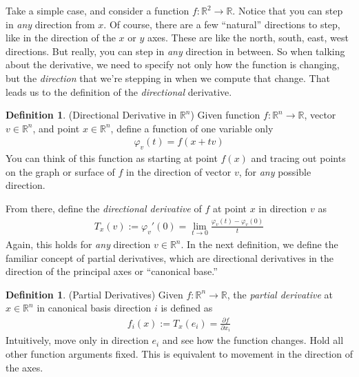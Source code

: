 \documentclass[12pt]{article}
\numberwithin{equation}{section} %
\theoremstyle{plain}
\theoremstyle{definition}
\newtheorem{defn}[thm]{Definition}
\theoremstyle{remark}
\newcommand{\R}{\mathbb{R}}
\newcommand{\Rn}{\mathbb{R}^n}
\begin{document}
Take a simple case, and consider a function $f:\R^2\rightarrow \R$.
Notice that you can step in \emph{any} direction from $x$. Of course,
there are a few ``natural'' directions to step, like in the direction of
the $x$ or $y$ axes. These are like the north, south, east, west
directions. But really, you can step in \emph{any} direction in between.
So when talking about the derivative, we need to specify not only how
the function is changing, but the \emph{direction} that we're stepping
in when we compute that change. That leads us to the definition of the
\emph{directional} derivative.
\begin{figure}[htpb!]
\centering
{}
\end{figure}

\begin{defn}{(Directional Derivative in $\Rn$)}
Given function $f:\Rn\rightarrow\R$, vector $v\in\Rn$, and point $x\in
\Rn$, define a function of one variable only
\begin{align*}
  \varphi_v(t) = f(x+tv)
\end{align*}
You can think of this function as starting at point $f(x)$ and tracing
out points on the graph or surface of $f$ in the direction of vector
$v$, for \emph{any} possible direction.

From there, define the \emph{directional derivative} of $f$ at point $x$
in direction $v$ as
\begin{align*}
  T_x(v) := \varphi_v'(0)
  = \lim_{t\rightarrow 0} \frac{\varphi_v(t)-\varphi_v(0)}{t}
\end{align*}
Again, this holds for \emph{any} direction $v\in\Rn$. In the next
definition, we define the familiar concept of partial derivatives, which
are directional derivatives in the direction of the principal axes or
``canonical base.''
\end{defn}

\begin{defn}{(Partial Derivatives)}
Given $f:\Rn\rightarrow\R$, the \emph{partial derivative} at $x\in\Rn$
in canonical basis direction $i$ is defined as
\begin{align*}
  f_i(x) := T_x(e_i) = \frac{\partial f}{\partial x_i}
\end{align*}
Intuitively, move only in direction $e_i$ and see how the function
changes. Hold all other function arguments fixed. This is equivalent to
movement in the direction of the axes.
\end{defn}
\end{document}
